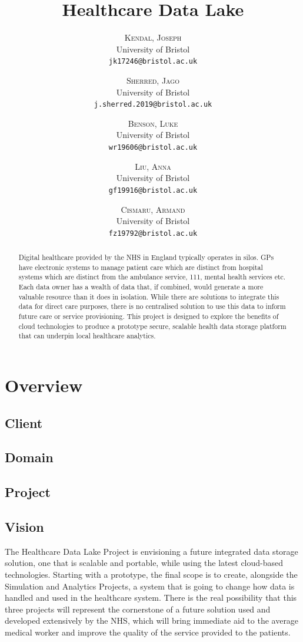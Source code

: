 \documentclass[10pt]{article}
\title{Healthcare Data Lake}
\author{
	\textsc{Kendal, Joseph}\\
	\normalsize University of Bristol\\
	\texttt{jk17246@bristol.ac.uk}
	
	\and
	
	\textsc{Sherred, Jago}\\
	\normalsize University of Bristol\\
	\texttt{j.sherred.2019@bristol.ac.uk}
	
	\and
	
	\textsc{Benson, Luke}\\
	\normalsize University of Bristol\\
	\texttt{wr19606@bristol.ac.uk}
	
	\and
	
	\textsc{Liu, Anna}\\
	\normalsize University of Bristol\\
	\texttt{gf19916@bristol.ac.uk}
	
	\and
	
	\textsc{Cismaru, Armand}\\
	\normalsize University of Bristol\\
	\texttt{fz19792@bristol.ac.uk}
}
\begin{document}
\maketitle    


\begin{abstract}

Digital healthcare provided by the NHS in England typically operates in silos. GPs have electronic systems to manage patient care which are distinct from hospital systems which are distinct from the ambulance service, 111, mental health services etc. Each data owner has a wealth of data that, if combined, would generate a more valuable resource than it does in isolation. While there are solutions to integrate this data for direct care purposes, there is no centralised solution to use this data to inform future care or service provisioning. This project is designed to explore the benefits of cloud technologies to produce a prototype secure, scalable health data storage platform that can underpin local healthcare analytics.

\end{abstract}

\section{Overview}

\subsection{Client}
\subsection{Domain}
\subsection{Project}
\subsection{Vision}
The Healthcare Data Lake Project is envisioning a future integrated data storage solution, one that is scalable and portable, while using the latest cloud-based technologies. Starting with a prototype, the final scope is to create, alongside the Simulation and Analytics Projects, a system that is going to change how data is handled and used in the healthcare system. There is the real possibility that this three projects will represent the cornerstone of a future solution used and developed extensively by the NHS, which will bring immediate aid to the average medical worker and improve the quality of the service provided to the patients.
\end{document}
